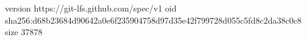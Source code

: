 version https://git-lfs.github.com/spec/v1
oid sha256:d68b23684d90642a0e6f235904758d97d35e42f799728d055c5fd8c2da38c0c8
size 37878
